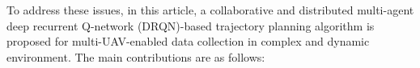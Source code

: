\documentclass[journal]{IEEEtran}
\begin{document}
To address these issues, in this article, a collaborative and distributed multi-agent deep recurrent Q-network (DRQN)-based trajectory planning algorithm is proposed for multi-UAV-enabled data collection in complex and dynamic environment. 
The main contributions are as follows: 
\end{document}
